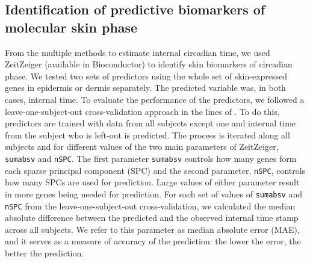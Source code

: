 \subsection*{Identification of predictive biomarkers of molecular skin phase}
From the multiple methods to estimate internal circadian time, we used ZeitZeiger \cite{Hughey2016} (available in Bioconductor) to identify skin biomarkers of circadian phase. We tested two sets of predictors using the whole set of skin-expressed genes in epidermis or dermis separately. The predicted variable was, in both cases, internal time. To evaluate the performance of the predictors, we followed a leave-one-subject-out cross-validation approach in the lines of \cite{Hughey2016, Wittenbrink2018}. To do this, predictors are trained with data from all subjects except one and internal time from the subject who is left-out is predicted. The process is iterated along all subjects and for different values of the two main parameters of ZeitZeiger, \texttt{sumabsv} and \texttt{nSPC}. The first parameter \texttt{sumabsv} controls how many genes form each sparse principal component (SPC) and the second parameter, \texttt{nSPC}, controls how many SPCs are used for prediction. Large values of either parameter result in more genes being needed for prediction. For each set of values of \texttt{sumabsv} and \texttt{nSPC} from the leave-one-subject-out cross-validation, we calculated the median absolute difference between the predicted and the observed internal time stamp across all subjects. We refer to this parameter as median absolute error (MAE), and it serves as a measure of accuracy of the prediction: the lower the error, the better the prediction. 






